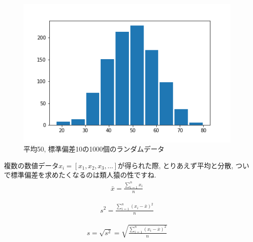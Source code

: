 \documentclass[11pt,a4paper]{jreport}
\begin{document}
\begin{figure}[H]
\label{im:histgram}
  \centering
  \includegraphics[width=120mm,bb=0 0 432 288]{figures/hist.png}
  \caption{平均50, 標準偏差10の1000個のランダムデータ}
\end{figure}

複数の数値データ$x_i = [x_1, x_2, x_3, ...]$が得られた際, とりあえず平均と分散, ついで標準偏差を求めたくなるのは類人猿の性ですね.\\
\begin{eqnarray}
\label{eq:ave}
\bar{x} = \frac{\sum_{i=1}^{n} x_i}{n}
\end{eqnarray}

\begin{eqnarray}
\label{eq:var}
s^2 = \frac{\sum_{i=1}^{n} (x_i - \bar{x})^2}{n}
\end{eqnarray}

\begin{eqnarray}
\label{eq:dev}
s = \sqrt{s^2} = \sqrt{\frac{\sum_{i=1}^{n} (x_i - \bar{x})^2}{n}}
\end{eqnarray}
\end{document}
